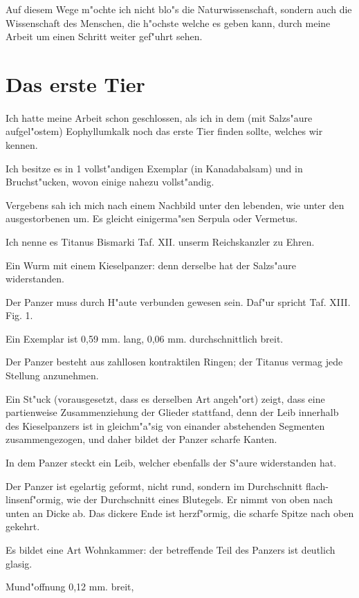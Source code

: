 \documentclass[a4paper, 11pt, oneside, german]{article}
\begin{document}
Auf diesem Wege m"ochte ich nicht blo"s die Naturwissenschaft, sondern auch die Wissenschaft des Menschen, die h"ochste welche es geben kann, durch meine Arbeit um einen Schritt weiter gef"uhrt sehen.
\clearpage
\section{Das erste Tier}
\paragraph{}
Ich hatte meine Arbeit schon geschlossen, als ich in dem (mit Salzs"aure aufgel"ostem) Eophyllumkalk noch das erste Tier finden sollte, welches wir kennen.

Ich besitze es in 1 vollst"andigen Exemplar (in Kanadabalsam) und in Bruchst"ucken, wovon einige nahezu vollst"andig.

Vergebens sah ich mich nach einem Nachbild unter den lebenden, wie unter den ausgestorbenen um. Es gleicht einigerma"sen Serpula oder Vermetus.

Ich nenne es Titanus Bismarki Taf. XII. unserm Reichskanzler zu Ehren.

Ein Wurm mit einem Kieselpanzer: denn derselbe hat der Salzs"aure widerstanden.

Der Panzer muss durch H"aute verbunden gewesen sein. Daf"ur spricht Taf. XIII. Fig. 1.

Ein Exemplar ist 0,59 mm. lang, 0,06 mm. durchschnittlich breit.

Der Panzer besteht aus zahllosen kontraktilen Ringen; der Titanus vermag jede Stellung anzunehmen.

Ein St"uck (vorausgesetzt, dass es derselben Art angeh"ort) zeigt, dass eine partienweise Zusammenziehung der Glieder stattfand, denn der Leib innerhalb des Kieselpanzers ist in gleichm"a"sig von einander abstehenden Segmenten zusammengezogen, und daher bildet der Panzer scharfe Kanten.

In dem Panzer steckt ein Leib, welcher ebenfalls der S"aure widerstanden hat.

Der Panzer ist egelartig geformt, nicht rund, sondern im Durchschnitt flach-linsenf"ormig, wie der Durchschnitt eines Blutegels. Er nimmt von oben nach unten an Dicke ab. Das dickere Ende ist herzf"ormig, die scharfe Spitze nach oben gekehrt.

Es bildet eine Art Wohnkammer: der betreffende Teil des Panzers ist deutlich glasig.

Mund"offnung 0,12 mm. breit,
\end{document}
